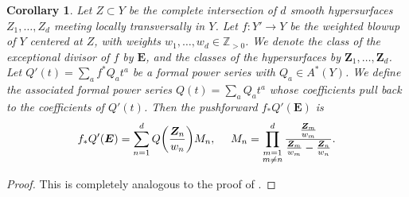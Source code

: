 \documentclass[11pt,oneside,english]{article}
\numberwithin{equation}{section}
\let\originalleft\left
\let\originalright\right
\renewcommand*{\left}{\mathopen{}\mathclose\bgroup\originalleft}
\renewcommand*{\right}{\aftergroup\egroup\originalright}
\newtheorem{corollary}[theorem]{Corollary}
\theoremstyle{definition}
\begin{document}
\begin{corollary} \label{maincor} Let $Z \subset Y$ be the complete intersection of $d$ smooth hypersurfaces $Z_1, \dots , Z_d$ meeting locally transversally in $Y$. Let $f :  Y' \rightarrow Y$ be the weighted blowup of $Y$ centered at $Z$, with weights $w_1, \dots, w_d \in \mathbb Z_{>0}$. We denote the class of the exceptional divisor of $f$ by $\boldsymbol E$, and the classes of the hypersurfaces by $\boldsymbol Z_1, \dots, \boldsymbol Z_d$. Let $  Q'(t) =  \sum_a f^*  Q_a t^a$ be a formal power series with $ Q_a \in A^*(Y)$. We define the associated formal power series $ Q(t) =\sum_a  Q_a t^a$ whose coefficients pull back to the coefficients of $ Q'(t)$. Then the pushforward $f_*  Q'(\boldsymbol E)$ is
	\begin{align}
	\label{eqn:maincor}
		f_*  Q'(\boldsymbol E) = \sum_{n=1}^d Q\left(\frac{\boldsymbol Z_n}{w_n}\right)  M_n, ~~~~ M_n = \prod_{\substack{m=1\\m\ne n}}^d \frac{\frac{\boldsymbol Z_m}{w_m}}{\frac{\boldsymbol Z_m}{w_m} - \frac{\boldsymbol Z_n}{w_n}}.
	\end{align}	
\end{corollary}
\begin{proof}
This is completely analogous to the proof of \cite[Theorem 1.8]{Esole:2017kyr}.
\end{proof}
\end{document}
